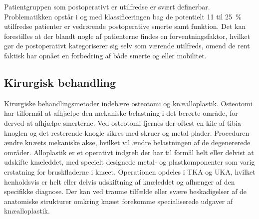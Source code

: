 Patientgruppen som postoperativt er utilfredse er svært definerbar. Problematikken opstår i og med klassificeringen bag de potentielt 11 til 25~\% utilfredse patienter er vedrørende postoperative smerte samt funktion. Det kan forestilles at der blandt nogle af patienterne findes en forventningsfaktor, hvilket gør de postoperativt kategoriserer sig selv som værende utilfreds, omend de rent faktisk har opnået en forbedring af både smerte og eller mobilitet.


\subsection{Kirurgisk behandling}

Kirurgiske behandlingsmetoder indebære osteotomi og knæalloplastik. Osteotomi har tilformål at afhjælpe den mekaniske belastning i det berørte område, for derved at afhjælpe smerterne. Ved osteotomi fjernes der oftest en kile af tibia-knoglen og det resterende knogle sikres med skruer og metal plader. Proceduren ændre knæets mekaniske akse, hvilket vil ændre belastningen af de degenererede områder. \citep{Osteotomi_og_TKA}
Alloplastik er et operativt indgreb der har til formål helt eller delvist at udskifte knæleddet, med specielt designede metal- og plastkomponenter som varig erstatning for bruskfladerne i knæet. Operationen opdeles i TKA og UKA, hvilket henholdsvis er helt eller delvis udskiftning af knæleddet og afhænger af den specifikke diagnose. Der kan ved traume tilfælde eller svære beskadigelser af de anatomiske strukturer omkring knæet forekomme specialiserede udgaver af knæalloplastik.

